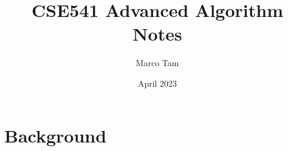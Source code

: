 \documentclass{article}
\title{CSE541 Advanced Algorithm Notes}
\author{Marco Tam }
\date{April 2023}
\begin{document}
\maketitle

\section{Background}
\end{document}
